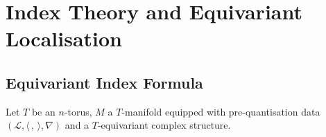 \documentclass[11pt]{amsart}
\newcommand{\mcL}{\mathcal{L}}
\begin{document}
\section{Index Theory and Equivariant Localisation} \label{sec:index-theory-localisation}

\subsection{Equivariant Index Formula} \label{subsec:equivariant-index}

Let $T$ be an $n$-torus, $M$ a $T$-manifold equipped with pre-quantisation data $(\mcL, \langle\, ,\, \rangle, \nabla)$ and a $T$-equivariant complex structure.





\providecommand{\bysame}{\leavevmode\hbox to3em{\hrulefill}\thinspace}
\providecommand{\href}[2]{#2}



\end{document}
